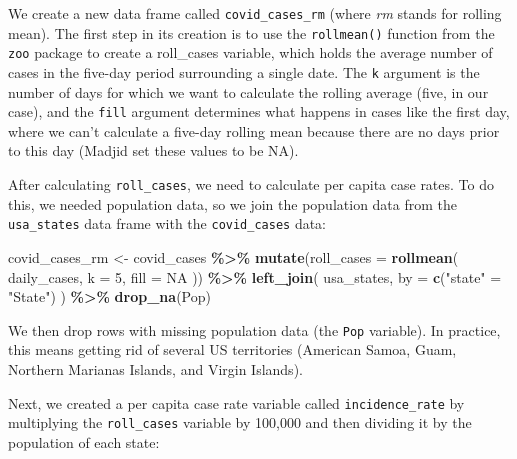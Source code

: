 \documentclass[
]{book}
\newenvironment{Shaded}{\begin{snugshade}}{\end{snugshade}}
\newcommand{\AttributeTok}[1]{\textcolor[rgb]{0.13,0.29,0.53}{#1}}
\newcommand{\ConstantTok}[1]{\textcolor[rgb]{0.56,0.35,0.01}{#1}}
\newcommand{\DecValTok}[1]{\textcolor[rgb]{0.00,0.00,0.81}{#1}}
\newcommand{\FunctionTok}[1]{\textcolor[rgb]{0.13,0.29,0.53}{\textbf{#1}}}
\newcommand{\NormalTok}[1]{#1}
\newcommand{\OtherTok}[1]{\textcolor[rgb]{0.56,0.35,0.01}{#1}}
\newcommand{\SpecialCharTok}[1]{\textcolor[rgb]{0.81,0.36,0.00}{\textbf{#1}}}
\newcommand{\StringTok}[1]{\textcolor[rgb]{0.31,0.60,0.02}{#1}}
\begin{document}
We create a new data frame called \texttt{covid\_cases\_rm} (where \emph{rm} stands for rolling mean). The first step in its creation is to use the \texttt{rollmean()} function from the \texttt{zoo} package to create a roll\_cases variable, which holds the average number of cases in the five-day period surrounding a single date. The \texttt{k} argument is the number of days for which we want to calculate the rolling average (five, in our case), and the \texttt{fill} argument determines what happens in cases like the first day, where we can't calculate a five-day rolling mean because there are no days prior to this day (Madjid set these values to be NA).

After calculating \texttt{roll\_cases}, we need to calculate per capita case rates. To do this, we needed population data, so we join the population data from the \texttt{usa\_states} data frame with the \texttt{covid\_cases} data:

\begin{Shaded}
\begin{Highlighting}[]
\NormalTok{covid\_cases\_rm }\OtherTok{\textless{}{-}}\NormalTok{ covid\_cases }\SpecialCharTok{\%\textgreater{}\%}
  \FunctionTok{mutate}\NormalTok{(}\AttributeTok{roll\_cases =} \FunctionTok{rollmean}\NormalTok{(}
\NormalTok{    daily\_cases,}
    \AttributeTok{k =} \DecValTok{5}\NormalTok{,}
    \AttributeTok{fill =} \ConstantTok{NA}
\NormalTok{  )) }\SpecialCharTok{\%\textgreater{}\%}
  \FunctionTok{left\_join}\NormalTok{(}
\NormalTok{    usa\_states,}
    \AttributeTok{by =} \FunctionTok{c}\NormalTok{(}\StringTok{"state"} \OtherTok{=} \StringTok{"State"}\NormalTok{)}
\NormalTok{  ) }\SpecialCharTok{\%\textgreater{}\%}
  \FunctionTok{drop\_na}\NormalTok{(Pop)}
\end{Highlighting}
\end{Shaded}

We then drop rows with missing population data (the \texttt{Pop} variable). In practice, this means getting rid of several US territories (American Samoa, Guam, Northern Marianas Islands, and Virgin Islands).

Next, we created a per capita case rate variable called \texttt{incidence\_rate} by multiplying the \texttt{roll\_cases} variable by 100,000 and then dividing it by the population of each state:
\end{document}
